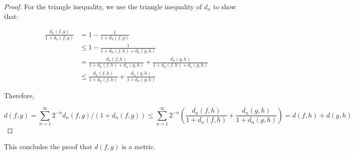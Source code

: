 \begin{proof}
\vspace{1em}

For the triangle inequality, we use the triangle inequality of $d_n$ to show that:

\begin{equation*}
\begin{split}
\frac{d_n(f, g)}{1 + d_n(f, g)} &= 1 - \frac{1}{1 + d_n(f, g)} \\
& \leq 1 - \frac{1}{1 + d_n(f, h) + d_n(g, h)} \\
& = \frac{d_n(f, h)}{1 + d_n(f, h) + d_n(g, h)} + \frac{d_n(g, h)}{1 + d_n(f, h) + d_n(g, h)} \\
& \leq \frac{d_n(f, h)}{1 + d_n(f, h)} + \frac{d_n(g, h)}{1 + d_n(g, h)}
\end{split}
\end{equation*}

Therefore,

$$d(f,g) = \sum_{n=1}^\infty 2^{-n}d_n(f, g) / ( 1 + d_n(f, g)) \leq 
 \sum_{n=1}^\infty 2^{-n} \left( \frac{d_n(f, h)}{1 + d_n(f, h)} + \frac{d_n(g, h)}{1 + d_n(g, h)} \right) = d(f,h) + d(g,h)$$

\end{proof}

This concludes the proof that $d(f,g)$ is a metric.

